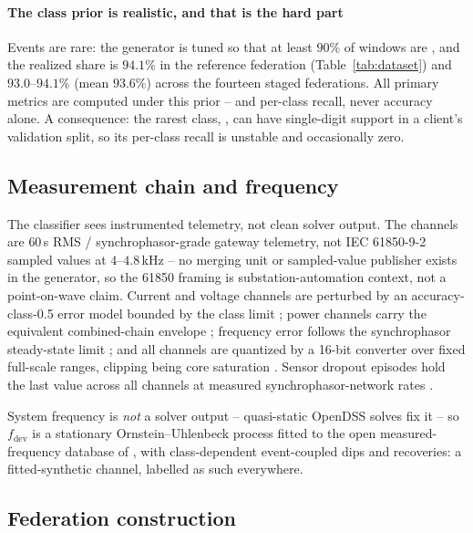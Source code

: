\documentclass[review,12pt]{elsarticle}
\begin{document}
\paragraph{The class prior is realistic, and that is the hard part}
Events are rare: the generator is tuned so that at least $90\%$ of
windows are , and the realized share is $94.1\%$ in the
reference federation (Table~\ref{tab:dataset}) and $93.0$--$94.1\%$
(mean $93.6\%$) across the fourteen staged federations. All primary
metrics are computed under this prior -- \macroF{} and per-class recall,
never accuracy alone. A consequence: the rarest class, ,
can have single-digit support in a client's validation split, so its
per-class recall is unstable and occasionally zero.

\subsection{Measurement chain and frequency}

The classifier sees instrumented telemetry, not clean solver output. The
channels are $60$\,s RMS / synchrophasor-grade gateway telemetry, not
IEC 61850-9-2 sampled values at $4$--$4.8$\,kHz -- no merging unit or
sampled-value publisher exists in the generator, so the 61850 framing is
substation-automation context, not a point-on-wave claim. Current and
voltage channels are perturbed by an accuracy-class-0.5 error model
bounded by the class limit \cite{iec61869-2,iec61869-3}; power channels
carry the equivalent combined-chain envelope \cite{iec62053-22};
frequency error follows the synchrophasor steady-state limit
\cite{ieeec37118}; and all channels are quantized by a 16-bit converter
over fixed full-scale ranges, clipping being core saturation
\cite{iec61869-9}. Sensor dropout episodes hold the last value across
all channels at measured synchrophasor-network rates \cite{naspi2017}.

System frequency is \emph{not} a solver output -- quasi-static OpenDSS
solves fix it -- so $f_{\mathrm{dev}}$ is a stationary
Ornstein--Uhlenbeck process fitted to the open measured-frequency
database of \cite{rydingorjao2020}, with class-dependent event-coupled
dips and recoveries: a fitted-synthetic channel, labelled as such
everywhere.

\subsection{Federation construction}
\end{document}
